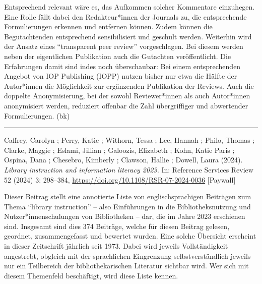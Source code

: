 \documentclass[a4paper,
fontsize=11pt,
oneside,
numbers=noperiodatend,
parskip=half-,
bibliography=totoc,
final
]{scrartcl}
\begin{document}
Entsprechend relevant wäre es, das Aufkommen solcher Kommentare
einzuhegen. Eine Rolle fällt dabei den Redakteur*innen der Journals zu,
die entsprechende Formulierungen erkennen und entfernen können. Zudem
können die Begutachtenden entsprechend sensibilisiert und geschult
werden. Weiterhin wird der Ansatz eines \enquote{transparent peer
review} vorgeschlagen. Bei diesem werden neben der eigentlichen
Publikation auch die Gutachten veröffentlicht. Die Erfahrungen damit
sind indes noch überschaubar: Bei einem entsprechenden Angebot von IOP
Publishing (IOPP) nutzen bisher nur etwa die Hälfte der Autor*innen die
Möglichkeit zur ergänzenden Publikation der Reviews. Auch die doppelte
Anonymisierung, bei der sowohl Reviewer*innen als auch Autor*innen
anonymisiert werden, reduziert offenbar die Zahl übergriffiger und
abwertender Formulierungen. (bk)

\begin{center}\rule{0.5\linewidth}{0.5pt}\end{center}

Caffrey, Carolyn ; Perry, Katie ; Withorn, Tessa ; Lee, Hannah ; Philo,
Thomas ; Clarke, Maggie ; Eslami, Jillian ; Galoozis, Elizabeth ; Kohn,
Katie Paris ; Ospina, Dana ; Chesebro, Kimberly ; Clawson, Hallie ;
Dowell, Laura (2024). \emph{Library instruction and information literacy
2023.} In: Reference Services Review 52 (2024) 3: 298--384,
\url{https://doi.org/10.1108/RSR-07-2024-0036} {[}Paywall{]}

Dieser Beitrag stellt eine annotierte Liste von englischsprachigen
Beiträgen zum Thema \enquote{library instruction} – also Einführungen in
die Bibliotheksnutzung und Nutzer*innenschulungen von Bibliotheken –
dar, die im Jahre 2023 erschienen sind. Insgesamt sind dies 374
Beiträge, welche für diesen Beitrag gelesen, geordnet, zusammengefasst
und bewertet wurden. Eine solche Übersicht erscheint in dieser
Zeitschrift jährlich seit 1973. Dabei wird jeweils Vollständigkeit
angestrebt, obgleich mit der sprachlichen Eingrenzung selbstverständlich
jeweils nur ein Teilbereich der bibliothekarischen Literatur sichtbar
wird. Wer sich mit diesem Themenfeld beschäftigt, wird diese Liste
kennen.
\end{document}
